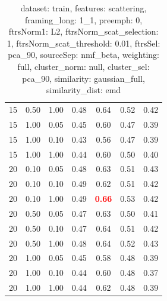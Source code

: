\documentclass[12pt,a4paper,fleqn]{tufte-handout}
\begin{document}
\begin{table}
\begin{center}
\begin{tabular}{lllcccc}
15 & 0.50 & 1.00 & 0.48 & 0.64 & 0.52 & 0.42 \\       
15 & 1.00 & 0.05 & 0.45 & 0.60 & 0.47 & 0.39 \\       
15 & 1.00 & 0.10 & 0.43 & 0.56 & 0.47 & 0.39 \\       
15 & 1.00 & 1.00 & 0.44 & 0.60 & 0.50 & 0.40 \\       
20 & 0.10 & 0.05 & 0.48 & 0.63 & 0.51 & 0.43 \\       
20 & 0.10 & 0.10 & 0.49 & 0.62 & 0.51 & 0.42 \\       
20 & 0.10 & 1.00 & 0.49 & \textbf{\textcolor{red}{0.66}} & 0.53 & 0.42 \\       
20 & 0.50 & 0.05 & 0.47 & 0.63 & 0.50 & 0.41 \\       
20 & 0.50 & 0.10 & 0.47 & 0.64 & 0.51 & 0.42 \\       
20 & 0.50 & 1.00 & 0.48 & 0.64 & 0.52 & 0.43 \\       
20 & 1.00 & 0.05 & 0.45 & 0.58 & 0.48 & 0.39 \\       
20 & 1.00 & 0.10 & 0.44 & 0.60 & 0.48 & 0.37 \\       
20 & 1.00 & 1.00 & 0.44 & 0.62 & 0.48 & 0.39 \\       
\end{tabular}       
\end{center}       
\caption{dataset: train, features: scattering, framing\_long: 1\_1, preemph: 0, ftrsNorm1: L2, ftrsNorm\_scat\_selection: 1, ftrsNorm\_scat\_threshold: 0.01, ftrsSel: pca\_90, sourceSep: nmf\_beta, weighting: full, cluster\_norm: null, cluster\_sel: pca\_90, similarity: gaussian\_full, similarity\_dist: emd}       
\label{datasetrFeaturscFraminlong1_1Preemp0Ftrsnorm1L2Ftrsnoscatselect1Ftrsnoscatthresh0.01Ftrsselpc90SourcesepnmbeWeightfuClustenormnuClusteselpc90SimilagafuSimiladistem}       
\end{table}       
 
\end{document}
